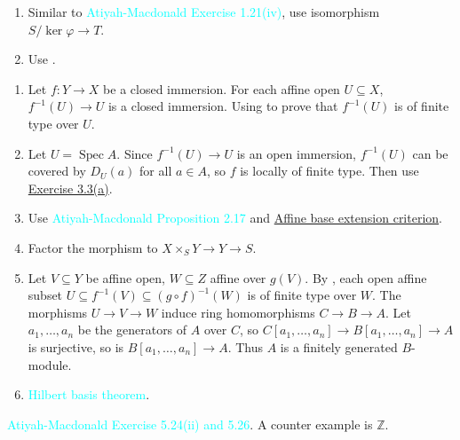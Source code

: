 \begin{exercise}\label{ex3.12}
	\begin{enumerate}[label=(\alph*),ref=\theexercise(\alph*)]
		\item Similar to \textcolor{cyan}{Atiyah-Macdonald Exercise 1.21(iv)}, use isomorphism $S/\ker\varphi\rightarrow T$.
		\item Use .
	\end{enumerate}
\end{exercise}

\begin{exercise}\label{ex3.13}
	\begin{enumerate}[label=(\alph*),ref=\theexercise(\alph*)]
		\item Let $f:Y\rightarrow X$ be a closed immersion. For each affine open $U\subseteq X$, $f^{-1}(U)\rightarrow U$ is a closed immersion. Using  to prove that $f^{-1}(U)$ is of finite type over $U$.
		\item Let $U=\operatorname{Spec}A$. Since $f^{-1}(U)\rightarrow U$ is an open immersion, $f^{-1}(U)$ can be covered by $D_U(a)$ for all $a\in A$, so $f$ is locally of finite type. Then use \hyperref[ex3.3]{Exercise 3.3(a)}.
		\addtocounter{enumi}{1}
		\item Use \textcolor{cyan}{Atiyah-Macdonald Proposition 2.17} and \hyperref[affinebaseext]{Affine base extension criterion}.
		\item Factor the morphism to $X\times_SY\rightarrow Y\rightarrow S$.
		\item Let $V\subseteq Y$ be affine open, $W\subseteq Z$ affine over $g(V)$. By , each open affine subset $U\subseteq f^{-1}(V)\subseteq(g\circ f)^{-1}(W)$ is of finite type over $W$. The morphisms $U\rightarrow V\rightarrow W$ induce ring homomorphisms $C\rightarrow B\rightarrow A$. Let $a_1,\dots,a_n$ be the generators of $A$ over $C$, so $C\!\left[a_1,\dots,a_n\right]\rightarrow B\!\left[a_1,\dots,a_n\right]\rightarrow A$ is surjective, so is $B\!\left[a_1,\dots,a_n\right]\rightarrow A$. Thus $A$ is a finitely generated $B$-module.
		\item \textcolor{cyan}{Hilbert basis theorem}.
	\end{enumerate}
\end{exercise}

\begin{exercise}\label{ex3.14}
	\textcolor{cyan}{Atiyah-Macdonald Exercise 5.24(ii) and 5.26}. A counter example is $\mathbb{Z}$.
\end{exercise}

